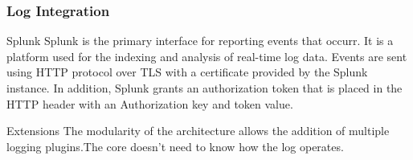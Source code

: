\begin{frame}
\frametitle{Log Integration}
\begin{block}{Splunk}
Splunk is the primary interface for reporting events that occurr. It is a platform used for the indexing and analysis of real-time log data.
Events are sent using HTTP protocol over TLS with a certificate provided by the Splunk instance. In addition, Splunk grants an authorization token that is placed in the HTTP header with an Authorization key and token value.
 \end{block}
\begin{block}{Extensions}
The modularity of the architecture allows the addition of multiple logging plugins.The core doesn't need to know how the log operates.
\end{block}


\end{frame}
